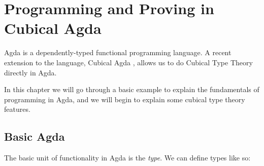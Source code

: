 \chapter{Programming and Proving in Cubical Agda}

Agda \cite{stumpVerifiedFunctionalProgramming2016} is a dependently-typed
functional programming language.
A recent extension to the language, Cubical Agda
\cite{vezzosiCubicalAgdaDependently2019}, allows us to do Cubical Type Theory
directly in Agda.

In this chapter we will go through a basic example to explain the fundamentals
of programming in Agda, and we will begin to explain some cubical type theory
features.
\section{Basic Agda}
The basic unit of functionality in Agda is the \emph{type}.
We can define types like so:
\begin{agdalisting}
\end{agdalisting}


